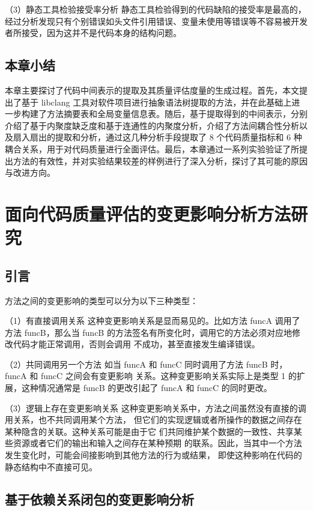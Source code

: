 （3）静态工具检验接受率分析
静态工具检验得到的代码缺陷的接受率是最高的，经过分析发现只有个别错误如头文件引用错误、变量未使用等错误等不容易被开发者所接受，因为这并不是代码本身的结构问题。

\section{本章小结}

本章主要探讨了代码中间表示的提取及其质量评估度量的生成过程。首先，本文提出了基于 libclang 工具对软件项目进行抽象语法树提取的方法，并在此基础上进一步构建了方法摘要表和全局变量信息表。随后，基于提取得到的中间表示，分别介绍了基于内聚度缺乏度和基于连通性的内聚度分析，介绍了方法间耦合性分析以及扇入扇出的提取和分析，通过这几种分析手段提取了 8 个代码质量指标和 6 种耦合关系，用于对代码质量进行全面评估。最后，本章通过一系列实验验证了所提出方法的有效性，并对实验结果较差的样例进行了深入分析，探讨了其可能的原因与改进方向。

\chapter{面向代码质量评估的变更影响分析方法研究}
\section{引言}
方法之间的变更影响的类型可以分为以下三种类型：

（1）有直接调用关系
这种变更影响关系是显而易见的。比如方法 funcA 调用了方法 funcB，那么当 funcB
的方法签名有所变化时，调用它的方法必须对应地修改代码才能正常调用，否则会调用
不成功，甚至直接发生编译错误。

（2）共同调用另一个方法
如当 funcA 和 funcC 同时调用了方法 funcB 时，funcA 和 funcC 之间会有变更影响
关系。这种变更影响关系实际上是类型 1 的扩展，这种情况通常是 funcB 的更改引起了
funcA 和 funcC 的同时更改。

（3）逻辑上存在变更影响关系
这种变更影响关系中，方法之间虽然没有直接的调用关系，也不共同调用某个方法，
但它们的实现逻辑或者所操作的数据之间存在某种隐含的关联。这种关系可能是由于它
们共同维护某个数据的一致性、共享某些资源或者它们的输出和输入之间存在某种预期
的联系。因此，当其中一个方法发生变化时，可能会间接影响到其他方法的行为或结果，
即使这种影响在代码的静态结构中不直接可见。

\section{基于依赖关系闭包的变更影响分析}

